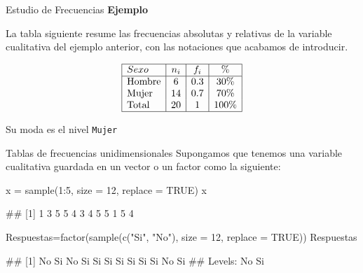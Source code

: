\documentclass[
  ignorenonframetext,
  aspectratio=169]{beamer}
\newenvironment{Shaded}{\begin{snugshade}}{\end{snugshade}}
\newcommand{\AttributeTok}[1]{\textcolor[rgb]{0.77,0.63,0.00}{#1}}
\newcommand{\ConstantTok}[1]{\textcolor[rgb]{0.00,0.00,0.00}{#1}}
\newcommand{\DecValTok}[1]{\textcolor[rgb]{0.00,0.00,0.81}{#1}}
\newcommand{\FunctionTok}[1]{\textcolor[rgb]{0.00,0.00,0.00}{#1}}
\newcommand{\NormalTok}[1]{#1}
\newcommand{\OtherTok}[1]{\textcolor[rgb]{0.56,0.35,0.01}{#1}}
\newcommand{\SpecialCharTok}[1]{\textcolor[rgb]{0.00,0.00,0.00}{#1}}
\newcommand{\StringTok}[1]{\textcolor[rgb]{0.31,0.60,0.02}{#1}}
\let\oldverbatim\verbatim
\let\endoldverbatim\endverbatim
\renewenvironment{verbatim}{\tiny\oldverbatim}{\endoldverbatim}
\begin{document}
\begin{frame}[fragile]{Estudio de Frecuencias}
\protect\hypertarget{estudio-de-frecuencias-5}{}
\textbf{Ejemplo}

La tabla siguiente resume las frecuencias absolutas y relativas de la
variable cualitativa del ejemplo anterior, con las notaciones que
acabamos de introducir.

\[\begin{array}{|l|c|c|c|}
\hline
Sexo   & n_i & f_i & \%     \\ 
\hline
\text{Hombre} & 6    & 0.3  & 30\%   \\ 
\text{Mujer}  & 14   & 0.7  & 70\%   \\ 
\text{Total}  & 20   & 1    & 100\%  \\
\hline
\end{array}\]

Su moda es el nivel \texttt{Mujer}
\end{frame}

\begin{frame}[fragile]{Tablas de frecuencias unidimensionales}
\protect\hypertarget{tablas-de-frecuencias-unidimensionales}{}
Supongamos que tenemos una variable cualitativa guardada en un vector o
un factor como la siguiente:

\begin{Shaded}
\begin{Highlighting}[]
\NormalTok{x }\OtherTok{=} \FunctionTok{sample}\NormalTok{(}\DecValTok{1}\SpecialCharTok{:}\DecValTok{5}\NormalTok{, }\AttributeTok{size =} \DecValTok{12}\NormalTok{, }\AttributeTok{replace =} \ConstantTok{TRUE}\NormalTok{)}
\NormalTok{x}
\end{Highlighting}
\end{Shaded}

\begin{verbatim}
##  [1] 1 3 5 5 4 3 4 5 5 1 5 4
\end{verbatim}

\begin{Shaded}
\begin{Highlighting}[]
\NormalTok{Respuestas}\OtherTok{=}\FunctionTok{factor}\NormalTok{(}\FunctionTok{sample}\NormalTok{(}\FunctionTok{c}\NormalTok{(}\StringTok{"Si"}\NormalTok{, }\StringTok{"No"}\NormalTok{), }\AttributeTok{size =} \DecValTok{12}\NormalTok{, }\AttributeTok{replace =} \ConstantTok{TRUE}\NormalTok{)) }
\NormalTok{Respuestas}
\end{Highlighting}
\end{Shaded}

\begin{verbatim}
##  [1] No Si No Si Si Si Si Si Si Si No Si
## Levels: No Si
\end{verbatim}
\end{frame}
\end{document}
